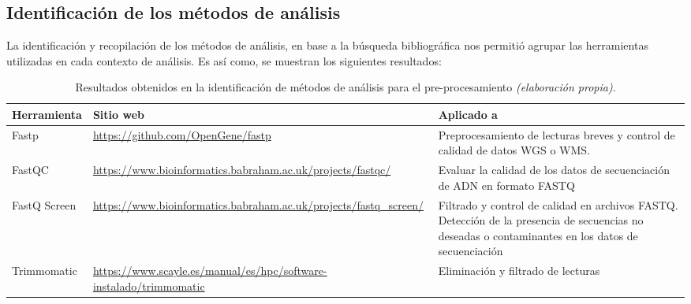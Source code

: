 \documentclass[12pt]{article}
\begin{document}
\subsection{Identificación de los métodos de análisis}

La identificación y recopilación de los métodos de análisis, 
en base a la búsqueda bibliográfica nos permitió agrupar las 
herramientas utilizadas en cada contexto de análisis. Es así como, 
se muestran los siguientes resultados:

\begin{table}[htbp]
    \centering
    \caption{Resultados obtenidos en la identificación de métodos de análisis para el pre-procesamiento \emph{(elaboración propia)}.}
    \label{tabla:preprocesamiento}
    \begin{tabularx}{\textwidth}{|p{3cm}|X|X|}
        \hline
        \textbf{Herramienta} & \textbf{Sitio web} & \textbf{Aplicado a} \\
        \hline
        Fastp & \href{https://github.com/OpenGene/fastp}{\url{https://github.com/OpenGene/fastp}} & Preprocesamiento de lecturas breves y control de calidad de datos WGS o WMS. \\
        \hline
        FastQC & \href{https://www.bioinformatics.babraham.ac.uk/projects/fastqc/}{\url{https://www.bioinformatics.babraham.ac.uk/projects/fastqc/}} & Evaluar la calidad de los datos de secuenciación de ADN en formato FASTQ \\
        \hline
        FastQ Screen & \href{https://www.bioinformatics.babraham.ac.uk/projects/fastq_screen/}{\url{https://www.bioinformatics.babraham.ac.uk/projects/fastq_screen/}} & Filtrado y control de calidad en archivos FASTQ. Detección de la presencia de secuencias no deseadas o contaminantes en los datos de secuenciación \\
        \hline
        Trimmomatic & \href{https://www.scayle.es/manual/es/hpc/software-instalado/trimmomatic}{\url{https://www.scayle.es/manual/es/hpc/software-instalado/trimmomatic}} & Eliminación y filtrado de lecturas \\
        \hline
    \end{tabularx}
\end{table}
\end{document}
